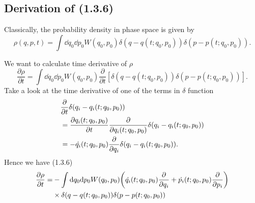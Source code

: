 \documentclass[10pt]{article}
\begin{document}
\subsection{Derivation of (1.3.6)}

Classically, the probability density in phase space is given by
\begin{equation}
	\rho(q,p,t) = \int \dd q_0 \dd p_0 W(q_0, p_0) \delta(q - q(t;q_0,p_0)) \delta(p - p(t;q_0,p_0)).
\end{equation}


We want to calculate time derivative of $\rho$
\begin{equation}
	\frac{\partial \rho}{\partial t} = \int \dd q_0 \dd p_0 W(q_0, p_0) \frac{\partial}{\partial t}[\delta(q - q(t;q_0,p_0)) \delta(p - p(t;q_0,p_0))].
\end{equation}
Take a look at the time derivative of one of the terms in $\delta$ function
\begin{align}
	&\pdv{t} \delta(q_i - q_i(t;q_0,p_0)) \\
	&= \pdv{q_i(t;q_0,p_0)}{t} \pdv{q_i(t;q_0,p_0)} \delta(q_i - q_i(t;q_0,p_0)) \\
	&= - \dot{q_i}(t;q_0,p_0) \pdv{q_i} \delta(q_i - q_i(t;q_0,p_0)).
\end{align}
Hence we have (1.3.6)
\begin{align*}
	\pdv{\rho}{t} =& -\int \dd q_0 \dd p_0 W(q_0, p_0) \qty(\dot{q_i}(t;q_0,p_0) \pdv{q_i} + \dot{p_i}(t;q_0,p_0) \pdv{p_i}) \\
	&\times \delta(q - q(t;q_0,p_0)) \delta(p - p(t;q_0,p_0))
\end{align*}
\end{document}
